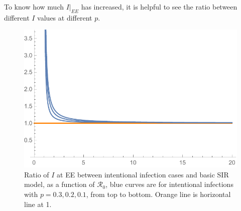 \documentclass[12pt]{article}
\newcommand{\R}{\mathcal{R}}
\begin{document}
To know how much $I|_{EE}$ has increased, it is helpful to see the ratio between different $I$ values at different $p$.

\begin{figure}[H]
  \centering
  \includegraphics[width=1.1\textwidth]{Figures/I_at_E_E__Ratio_plot.pdf}
  \caption{Ratio of $I$ at EE between intentional infection cases and basic SIR model, as a function of $\R_0$, blue curves are for intentional infections with $p=0.3,0.2,0.1$, from top to bottom. Orange line is horizontal line at 1.}
\end{figure}
\end{document}
